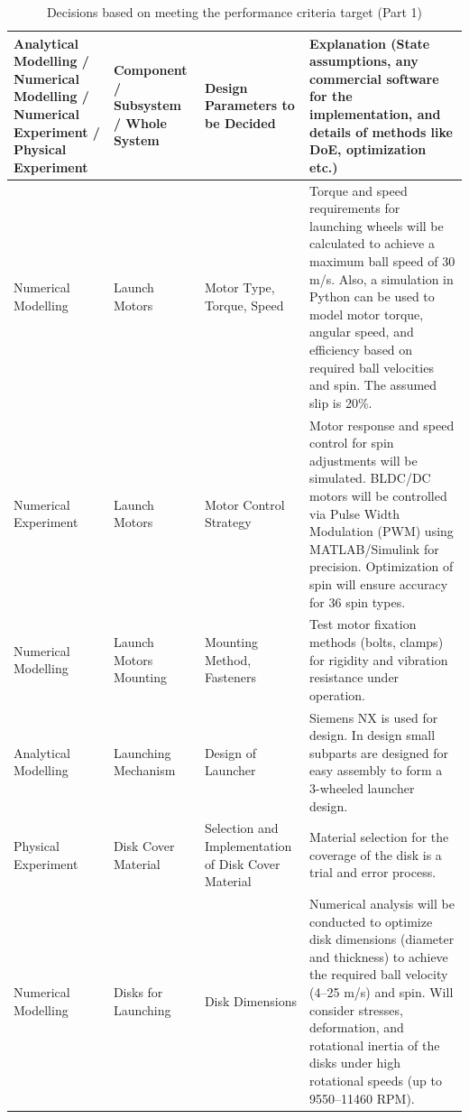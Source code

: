\documentclass[12pt]{article}
\renewcommand{\arraystretch}{1.2} %
\begin{document}
\begin{table}[H]
\centering
\caption{Decisions based on meeting the performance criteria target (Part 1)}
\scriptsize %
\renewcommand{\arraystretch}{1.5}
\setlength{\tabcolsep}{4pt}
\begin{tabular}{|>{\raggedright\arraybackslash}p{3cm}|>{\raggedright\arraybackslash}p{3cm}|>{\raggedright\arraybackslash}p{3cm}|>{\raggedright\arraybackslash}p{6cm}|}
\hline
\textbf{Analytical Modelling / Numerical Modelling / Numerical Experiment / Physical Experiment} & \textbf{Component / Subsystem / Whole System} & \textbf{Design Parameters to be Decided} & \textbf{Explanation (State assumptions, any commercial software for the implementation, and details of methods like DoE, optimization etc.)} \\ \hline
Numerical Modelling & Launch Motors & Motor Type, Torque, Speed & Torque and speed requirements for launching wheels will be calculated to achieve a maximum ball speed of 30 m/s. Also, a simulation in Python can be used to model motor torque, angular speed, and efficiency based on required ball velocities and spin. The assumed slip is 20\%. \\ \hline
Numerical Experiment & Launch Motors & Motor Control Strategy & Motor response and speed control for spin adjustments will be simulated. BLDC/DC motors will be controlled via Pulse Width Modulation (PWM) using MATLAB/Simulink for precision. Optimization of spin will ensure accuracy for 36 spin types. \\ \hline
Numerical Modelling & Launch Motors Mounting & Mounting Method, Fasteners & Test motor fixation methods (bolts, clamps) for rigidity and vibration resistance under operation. \\ \hline
Analytical Modelling & Launching Mechanism & Design of Launcher & Siemens NX is used for design. In design small subparts are designed for easy assembly to form a 3-wheeled launcher design. \\ \hline
Physical Experiment & Disk Cover Material & Selection and Implementation of Disk Cover Material & Material selection for the coverage of the disk is a trial and error process. \\ \hline
Numerical Modelling & Disks for Launching & Disk Dimensions & Numerical analysis will be conducted to optimize disk dimensions (diameter and thickness) to achieve the required ball velocity (4--25 m/s) and spin. Will consider stresses, deformation, and rotational inertia of the disks under high rotational speeds (up to 9550--11460 RPM). \\ \hline
\end{tabular}
\label{tab:performance_criteria}
\end{table}
\end{document}

